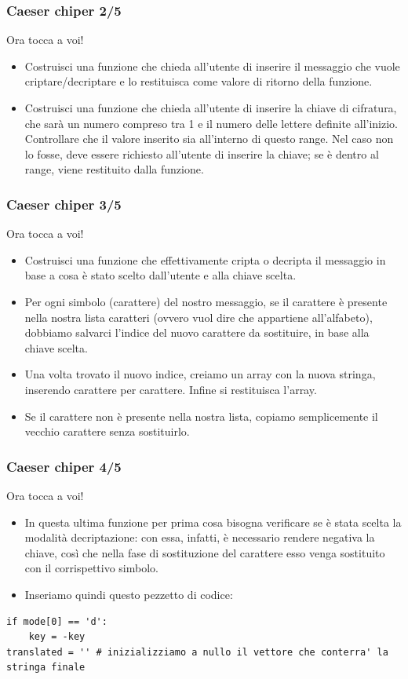 \documentclass{beamer}
\begin{document}
\begin{frame}[fragile]
\frametitle{Caeser chiper 2/5}
\begin{block}{Ora tocca a voi!}
	\begin{itemize}
		\item Costruisci una funzione che chieda all'utente di inserire il messaggio che vuole criptare/decriptare e lo restituisca come valore di ritorno della funzione.
		\item Costruisci una funzione che chieda all'utente di inserire la chiave di cifratura, che sarà un numero compreso tra 1 e il numero delle lettere definite all'inizio. Controllare che il valore inserito sia all'interno di questo range. Nel caso non lo fosse, deve essere richiesto all'utente di inserire la chiave; se è dentro al range, viene restituito dalla funzione.
	\end{itemize}
\end{block}
\end{frame}

\begin{frame}[fragile]
\frametitle{Caeser chiper 3/5}
\begin{block}{Ora tocca a voi!}
	\begin{itemize}
		\item Costruisci una funzione che effettivamente cripta o decripta il messaggio in base a cosa è stato scelto dall'utente e alla chiave scelta. 
		\item Per ogni simbolo (carattere) del nostro messaggio, se il carattere è presente nella nostra lista caratteri (ovvero vuol dire che appartiene all'alfabeto), dobbiamo salvarci l'indice del nuovo carattere da sostituire, in base alla chiave scelta.
		\item Una volta trovato il nuovo indice, creiamo un array con la nuova stringa, inserendo carattere per carattere. Infine si restituisca l'array.
		\item Se il carattere non è presente nella nostra lista, copiamo semplicemente il vecchio carattere senza sostituirlo.
	\end{itemize}
\end{block}
\end{frame}

\begin{frame}[fragile]
\frametitle{Caeser chiper 4/5}
\begin{block}{Ora tocca a voi!}
	\begin{itemize}
		\item In questa ultima funzione per prima cosa bisogna verificare se è stata scelta la modalità decriptazione: con essa, infatti, è necessario rendere negativa la chiave, così che nella fase di sostituzione del carattere esso venga sostituito con il corrispettivo simbolo.
		\item Inseriamo quindi questo pezzetto di codice:
	\end{itemize}
\end{block}
\begin{lstlisting}
if mode[0] == 'd':
    key = -key
translated = '' # inizializziamo a nullo il vettore che conterra' la stringa finale
\end{lstlisting}
\end{frame}
\end{document}
